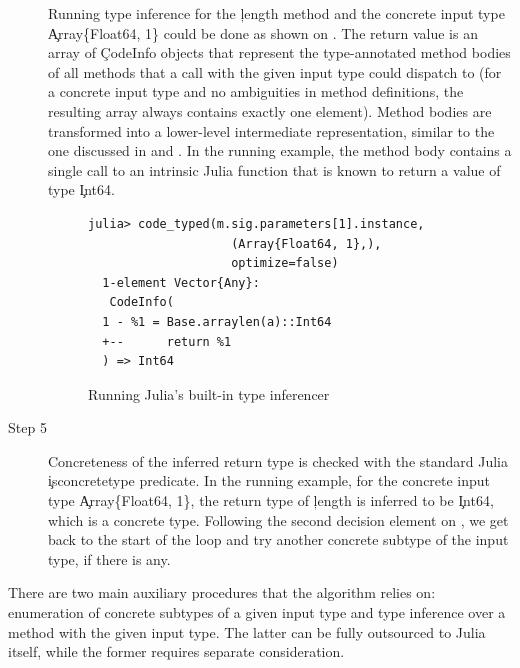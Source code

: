 \begin{description}
  Running type inference for the \c{length} method and the concrete input type
  \c{Array\{Float64, 1\}} could be done as shown on .
  The return value is an array of \c{CodeInfo} objects that represent
  the type-annotated method bodies of all methods that a call with the given input type
  could dispatch to (for a concrete input type and no ambiguities in method
  definitions, the resulting array always contains exactly one element).
  Method bodies are transformed into
  a lower-level intermediate representation, similar to the one
  discussed in  and . 
  In the running example, the
  method body contains a single call to an intrinsic Julia function that is
  known to return a value of type \c{Int64}.

  \begin{figure}[hbt]
\begin{lstlisting}[style=jterm]
  julia> code_typed(m.sig.parameters[1].instance,
                    (Array{Float64, 1},),
                    optimize=false)
  1-element Vector{Any}:
   CodeInfo(
  1 - %1 = Base.arraylen(a)::Int64
  +--      return %1
  ) => Int64
\end{lstlisting}
    \caption{Running Julia's built-in type inferencer}%
    \label{fig:julia-type-infer}
  \end{figure}

  \item[Step 5] Concreteness of the inferred return type is checked 
  with the standard Julia \c{isconcretetype} predicate. 
  In the running example, for the concrete input type \c{Array\{Float64, 1\}},
  the return type of \c{length} is inferred to be \c{Int64}, which is a concrete type.
  Following the second decision element on , we get back to
  the start of the loop and try another concrete subtype of the input type,
  if there is any.
\end{description}

There are two main auxiliary procedures that the algorithm relies on: enumeration of
concrete subtypes of a given input type and type inference over a method with the
given input type. The latter can be fully outsourced to Julia itself, while the
former requires separate consideration.

